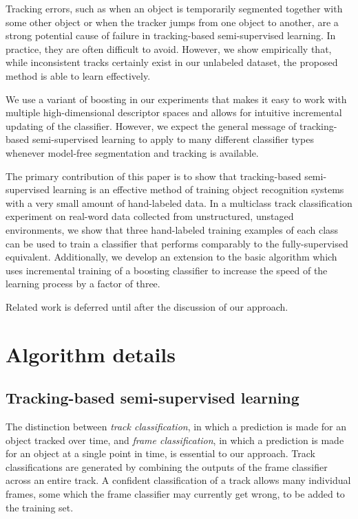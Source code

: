 \documentclass[conference]{IEEEtran}
\begin{document}
Tracking errors, such as when an object is temporarily segmented together with some other object or when the tracker jumps from one object to another, are a strong potential cause of failure in tracking-based semi-supervised learning.  In practice, they are often difficult to avoid.  However, we show empirically that, while inconsistent tracks certainly exist in our unlabeled dataset, the proposed method is able to learn effectively.

We use a variant of boosting in our experiments that makes it easy to work with multiple high-dimensional descriptor spaces and allows for intuitive incremental updating of the classifier.  However, we expect the general message of tracking-based semi-supervised learning to apply to many different classifier types whenever model-free segmentation and tracking is available.

The primary contribution of this paper is to show that tracking-based semi-supervised learning is an effective method of training object recognition systems with a very small amount of hand-labeled data.  In a multiclass track classification experiment on real-word data collected from unstructured, unstaged environments, we show that three hand-labeled training examples of each class can be used to train a classifier that performs comparably to the fully-supervised equivalent.  Additionally, we develop an extension to the basic algorithm which uses incremental training of a boosting classifier to increase the speed of the learning process by a factor of three.

Related work is deferred until after the discussion of our approach.


\section{Algorithm details}

\subsection{Tracking-based semi-supervised learning}

\renewcommand{\S}{\ensuremath{\mathbb{S}}\xspace}
\newcommand{\U}{\ensuremath{\mathbb{U}}\xspace}
\newcommand{\B}{\ensuremath{\mathbb{B}}\xspace}
\newcommand{\W}{\ensuremath{\mathbb{W}}\xspace}
\newcommand{\C}{\ensuremath{\mathbb{C}}\xspace}

The distinction between \textit{track classification}, in which a prediction is made for an object tracked over time, and \textit{frame classification}, in which a prediction is made for an object at a single point in time, is essential to our approach.  Track classifications are generated by combining the outputs of the frame classifier across an entire track.  A confident classification of a track allows many individual frames, some which the frame classifier may currently get wrong, to be added to the training set.
\end{document}
